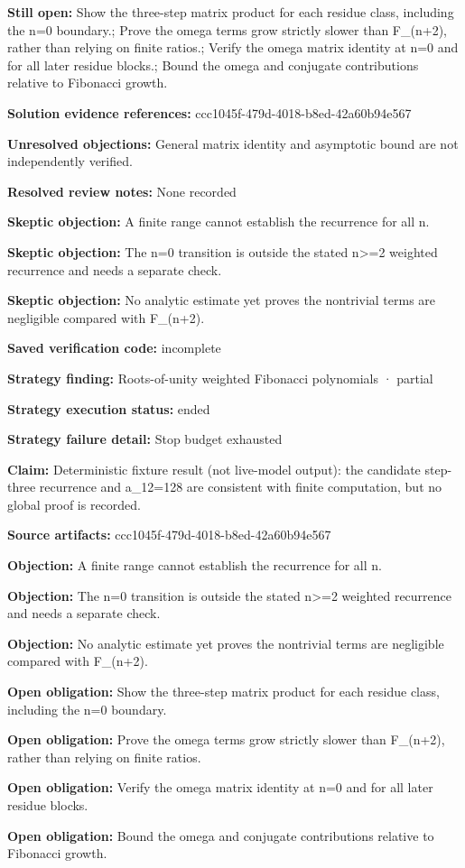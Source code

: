 \documentclass[11pt]{article}
\begin{document}
\textbf{Still open:} Show the three-step matrix product for each residue class, including the n=0 boundary.; Prove the omega terms grow strictly slower than F\_(n+2), rather than relying on finite ratios.; Verify the omega matrix identity at n=0 and for all later residue blocks.; Bound the omega and conjugate contributions relative to Fibonacci growth.\par
\textbf{Solution evidence references:} ccc1045f-479d-4018-b8ed-42a60b94e567\par
\textbf{Unresolved objections:} General matrix identity and asymptotic bound are not independently verified.\par
\textbf{Resolved review notes:} None recorded\par
\textbf{Skeptic objection:} A finite range cannot establish the recurrence for all n.\par
\textbf{Skeptic objection:} The n=0 transition is outside the stated n\textgreater{}=2 weighted recurrence and needs a separate check.\par
\textbf{Skeptic objection:} No analytic estimate yet proves the nontrivial terms are negligible compared with F\_(n+2).\par
\textbf{Saved verification code:} incomplete\par
\textbf{Strategy finding:} Roots-of-unity weighted Fibonacci polynomials · partial\par
\textbf{Strategy execution status:} ended\par
\textbf{Strategy failure detail:} Stop budget exhausted\par
\textbf{Claim:} Deterministic fixture result (not live-model output): the candidate step-three recurrence and a\_12=128 are consistent with finite computation, but no global proof is recorded.\par
\textbf{Source artifacts:} ccc1045f-479d-4018-b8ed-42a60b94e567\par
\textbf{Objection:} A finite range cannot establish the recurrence for all n.\par
\textbf{Objection:} The n=0 transition is outside the stated n\textgreater{}=2 weighted recurrence and needs a separate check.\par
\textbf{Objection:} No analytic estimate yet proves the nontrivial terms are negligible compared with F\_(n+2).\par
\textbf{Open obligation:} Show the three-step matrix product for each residue class, including the n=0 boundary.\par
\textbf{Open obligation:} Prove the omega terms grow strictly slower than F\_(n+2), rather than relying on finite ratios.\par
\textbf{Open obligation:} Verify the omega matrix identity at n=0 and for all later residue blocks.\par
\textbf{Open obligation:} Bound the omega and conjugate contributions relative to Fibonacci growth.\par
\end{document}
